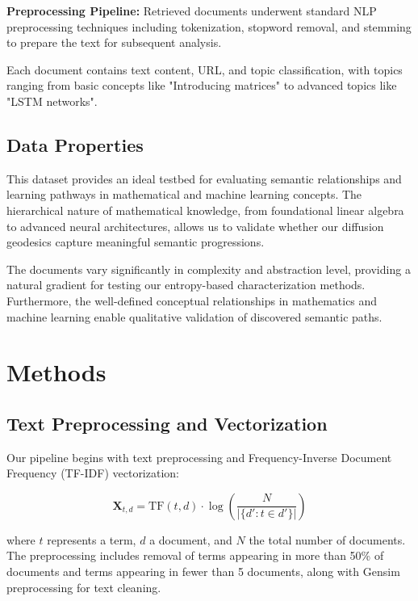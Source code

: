 \documentclass[12pt,a4paper]{article}
\begin{document}
\textbf{Preprocessing Pipeline:} Retrieved documents underwent standard NLP preprocessing techniques including tokenization, stopword removal, and stemming to prepare the text for subsequent analysis.

Each document contains text content, URL, and topic classification, with topics ranging from basic concepts like "Introducing matrices" to advanced topics like "LSTM networks".

\subsection{Data Properties}

This dataset provides an ideal testbed for evaluating semantic relationships and learning pathways in mathematical and machine learning concepts. The hierarchical nature of mathematical knowledge, from foundational linear algebra to advanced neural architectures, allows us to validate whether our diffusion geodesics capture meaningful semantic progressions.

The documents vary significantly in complexity and abstraction level, providing a natural gradient for testing our entropy-based characterization methods. Furthermore, the well-defined conceptual relationships in mathematics and machine learning enable qualitative validation of discovered semantic paths.

\section{Methods}

\subsection{Text Preprocessing and Vectorization}

Our pipeline begins with text preprocessing and Frequency-Inverse Document Frequency (TF-IDF) \cite{salton1988term} vectorization:

\begin{equation}
\mathbf{X}_{t,d} = \text{TF}(t,d) \cdot \log\left(\frac{N}{|\{d' : t \in d'\}|}\right)
\end{equation}

where $t$ represents a term, $d$ a document, and $N$ the total number of documents. The preprocessing includes removal of terms appearing in more than 50\% of documents and terms appearing in fewer than 5 documents, along with Gensim preprocessing for text cleaning.
\end{document}
